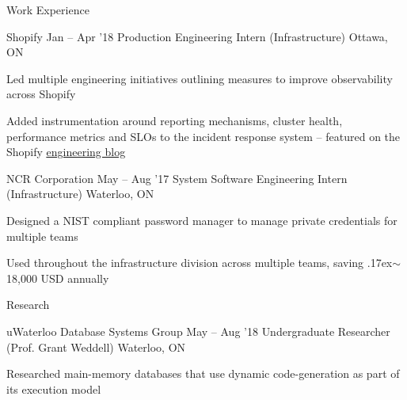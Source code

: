 \documentclass{resume} %
\begin{document}
\begin{rSection}{Work Experience}
  \begin{rSubsection}{Shopify}
		     {Jan -- Apr '18}
		     {Production Engineering Intern (Infrastructure)}
		     {Ottawa, ON}
    \item Led multiple engineering initiatives outlining measures to improve
      observability across Shopify
    \item Added instrumentation around reporting mechanisms, cluster health,
      performance metrics and SLOs to the incident response system -- featured on the Shopify 
      \href{https://engineering.shopify.com/blogs/engineering/implementing-chatops-into-our-incident-management-procedure}
      {\underline{engineering blog}}
  \end{rSubsection}

  \begin{rSubsection}{NCR Corporation}
		     {May -- Aug '17}
		     {System Software Engineering Intern (Infrastructure)}
		     {Waterloo, ON}
    \item Designed a NIST compliant password manager to manage private
      credentials for multiple teams
    \item Used throughout the infrastructure division across multiple
      teams, saving {\raise.17ex\hbox{$\scriptstyle\mathtt{\sim}$}}18,000 USD
      annually
  \end{rSubsection}
\end{rSection} 

\begin{rSection}{Research}
  \begin{rSubsection}{uWaterloo Database Systems Group}
	  {May -- Aug '18}
    {Undergraduate Researcher (Prof. Grant Weddell)}
	  {Waterloo, ON}
    \item Researched main-memory databases that use dynamic
      code-generation as part of its execution model
  \end{rSubsection}
\end{rSection}
\end{document}
